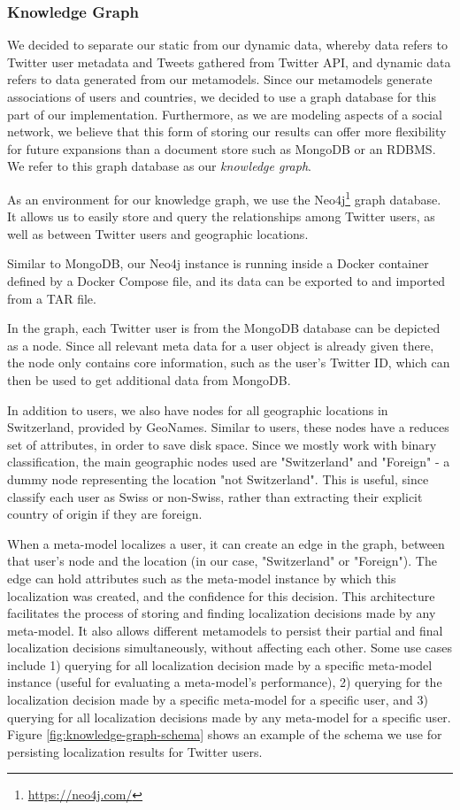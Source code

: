 \documentclass[10pt,a4paper]{article}
\begin{document}
\subsubsection{Knowledge Graph}
We decided to separate our static from our dynamic data, whereby data refers to Twitter user metadata and Tweets gathered from Twitter API, and dynamic data refers to data generated from our metamodels. Since our metamodels generate associations of users and countries, we decided to use a graph database for this part of our implementation. Furthermore, as we are modeling aspects of a social network, we believe that this form of storing our results can offer more flexibility for future expansions than a document store such as MongoDB or an RDBMS. We refer to this graph database as our \textit{knowledge graph}.

As an environment for our knowledge graph, we use the Neo4j\footnote{\href{https://neo4j.com/}{https://neo4j.com/}} graph database. It allows us to easily store and query the relationships among Twitter users, as well as between Twitter users and geographic locations. 

Similar to MongoDB, our Neo4j instance is running inside a Docker container defined by a Docker Compose file, and its data can be exported to and imported from a TAR file.

In the graph, each Twitter user is from the MongoDB database can be depicted as a node. Since all relevant meta data for a user object is already given there, the node only contains core information, such as the user's Twitter ID, which can then be used to get additional data from MongoDB. 

In addition to users, we also have nodes for all geographic locations in Switzerland, provided by GeoNames. Similar to users, these nodes have a reduces set of attributes, in order to save disk space. Since we mostly work with binary classification, the main geographic nodes used are "Switzerland" and "Foreign" - a dummy node representing the location "not Switzerland". This is useful, since classify each user as Swiss or non-Swiss, rather than extracting their explicit country of origin if they are foreign.

When a meta-model localizes a user, it can create an edge in the graph, between that user's node and the location (in our case, "Switzerland" or "Foreign"). The edge can hold attributes such as the meta-model instance by which this localization was created, and the confidence for this decision. This architecture facilitates the process of storing and finding localization decisions made by any meta-model. It also allows different metamodels to persist their partial and final localization decisions simultaneously, without affecting each other. Some use cases include 1) querying for all localization decision made by a specific meta-model instance (useful for evaluating a meta-model's performance), 2) querying for the localization decision made by a specific meta-model for a specific user, and 3) querying for all localization decisions made by any meta-model for a specific user. Figure \ref{fig:knowledge-graph-schema} shows an example of the schema we use for persisting localization results for Twitter users.
\end{document}
